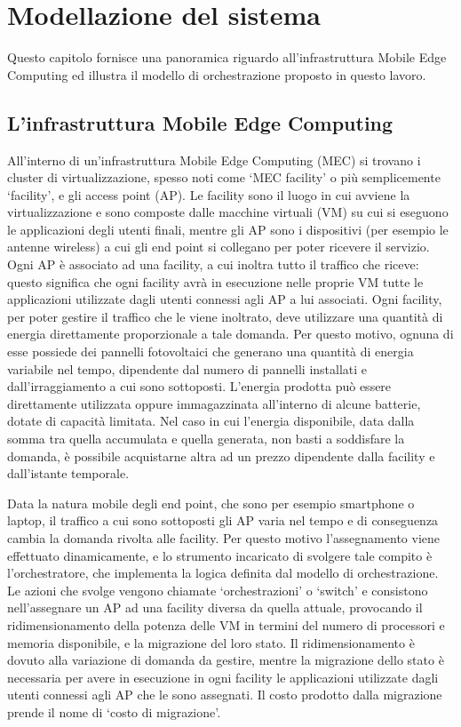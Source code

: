 \chapter{Modellazione del sistema}
\label{cap:modellazione-sistema}

Questo capitolo fornisce una panoramica riguardo all'infrastruttura Mobile Edge Computing ed illustra il modello di orchestrazione proposto in questo lavoro.


%
%
\section{L'infrastruttura Mobile Edge Computing}
\label{sec:infrastruttura-mec}

All'interno di un'infrastruttura Mobile Edge Computing (MEC) si trovano i cluster di virtualizzazione, spesso noti come `MEC facility' o più semplicemente `facility', e gli access point (AP). Le facility sono il luogo in cui avviene la virtualizzazione e sono composte dalle macchine virtuali (VM) su cui si eseguono le applicazioni degli utenti finali, mentre gli AP sono i dispositivi (per esempio le antenne wireless) a cui gli end point si collegano per poter ricevere il servizio. Ogni AP è associato ad una facility, a cui inoltra tutto il traffico che riceve: questo significa che ogni facility avrà in esecuzione nelle proprie VM tutte le applicazioni utilizzate dagli utenti connessi agli AP a lui associati. Ogni facility, per poter gestire il traffico che le viene inoltrato, deve utilizzare una quantità di energia direttamente proporzionale a tale domanda. Per questo motivo, ognuna di esse possiede dei pannelli fotovoltaici che generano una quantità di energia variabile nel tempo, dipendente dal numero di pannelli installati e dall'irraggiamento a cui sono sottoposti. L'energia prodotta può essere direttamente utilizzata oppure immagazzinata all'interno di alcune batterie, dotate di capacità limitata. Nel caso in cui l'energia disponibile, data dalla somma tra quella accumulata e quella generata, non basti a soddisfare la domanda, è possibile acquistarne altra ad un prezzo dipendente dalla facility e dall'istante temporale.

Data la natura mobile degli end point, che sono per esempio smartphone o laptop, il traffico a cui sono sottoposti gli AP varia nel tempo e di conseguenza cambia la domanda rivolta alle facility. Per questo motivo l'assegnamento viene effettuato dinamicamente, e lo strumento incaricato di svolgere tale compito è l'orchestratore, che implementa la logica definita dal modello di orchestrazione. Le azioni che svolge vengono chiamate `orchestrazioni' o `switch' e consistono nell'assegnare un AP ad una facility diversa da quella attuale, provocando il ridimensionamento della potenza delle VM in termini del numero di processori e memoria disponibile, e la migrazione del loro stato. Il ridimensionamento è dovuto alla variazione di domanda da gestire, mentre la migrazione dello stato è necessaria per avere in esecuzione in ogni facility le applicazioni utilizzate dagli utenti connessi agli AP che le sono assegnati. Il costo prodotto dalla migrazione prende il nome di `costo di migrazione'.


